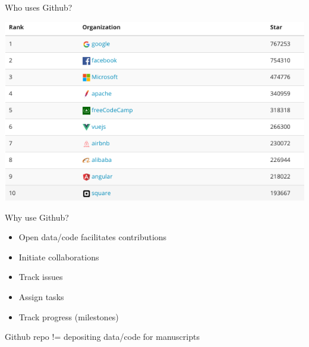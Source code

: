 \documentclass[12pt]{beamer}
\begin{document}
\begin{frame}

	\begin{flushright}
  	\Large \textcolor{boss2}{Who uses Github?} 
	\end{flushright}

  \begin{center}
    \includegraphics[width=\textwidth]{figs/topRepos.png}
  \end{center}

\end{frame}










\begin{frame}

	\begin{flushright}
  	\Large \textcolor{boss2}{Why use Github?} 
	\end{flushright}

	\begin{itemize}
		\item Open data/code facilitates contributions
		\item Initiate collaborations
		\item Track issues
		\item Assign tasks
		\item Track progress (milestones)
	\end{itemize}

	\bigskip
	\bigskip
	\textcolor{boss3}{Github repo != depositing data/code for manuscripts} \\

\end{frame}
\end{document}
